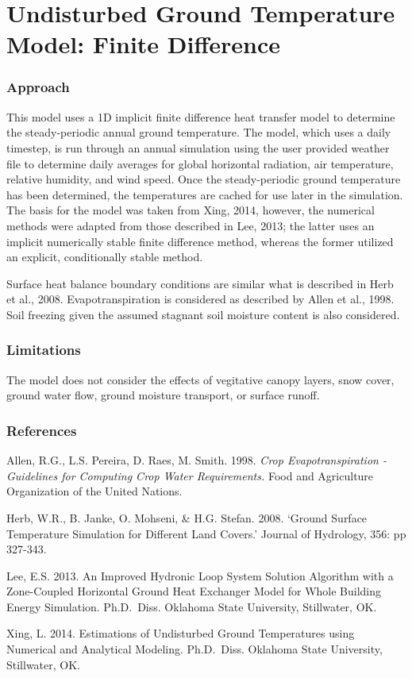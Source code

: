 \section{Undisturbed Ground Temperature Model: Finite Difference}\label{undisturbed-ground-temperature-model-finite-difference}

\subsubsection{Approach}\label{approach-003}

This model uses a 1D implicit finite difference heat transfer model to determine the steady-periodic annual ground temperature. The model, which uses a daily timestep, is run through an annual simulation using the user provided weather file to determine daily averages for global horizontal radiation, air temperature, relative humidity, and wind speed. Once the steady-periodic ground temperature has been determined, the temperatures are cached for use later in the simulation. The basis for the model was taken from Xing, 2014, however, the numerical methods were adapted from those described in Lee, 2013; the latter uses an implicit numerically stable finite difference method, whereas the former utilized an explicit, conditionally stable method.

Surface heat balance boundary conditions are similar what is described in Herb et al., 2008. Evapotranspiration is considered as described by Allen et al., 1998. Soil freezing given the assumed stagnant soil moisture content is also considered.

\subsubsection{Limitations}\label{limitations}

The model does not consider the effects of vegitative canopy layers, snow cover, ground water flow, ground moisture transport, or surface runoff.

\subsubsection{References}\label{references-048}

Allen, R.G., L.S. Pereira, D. Raes, M. Smith. 1998. \emph{Crop Evapotranspiration - Guidelines for Computing Crop Water Requirements.} Food and Agriculture Organization of the United Nations.

Herb, W.R., B. Janke, O. Mohseni, \& H.G. Stefan. 2008. `Ground Surface Temperature Simulation for Different Land Covers.' Journal of Hydrology, 356: pp 327-343.

Lee, E.S. 2013. An Improved Hydronic Loop System Solution Algorithm with a Zone-Coupled Horizontal Ground Heat Exchanger Model for Whole Building Energy Simulation. Ph.D.~Diss. Oklahoma State University, Stillwater, OK.

Xing, L. 2014. Estimations of Undisturbed Ground Temperatures using Numerical and Analytical Modeling. Ph.D.~Diss. Oklahoma State University, Stillwater, OK.
